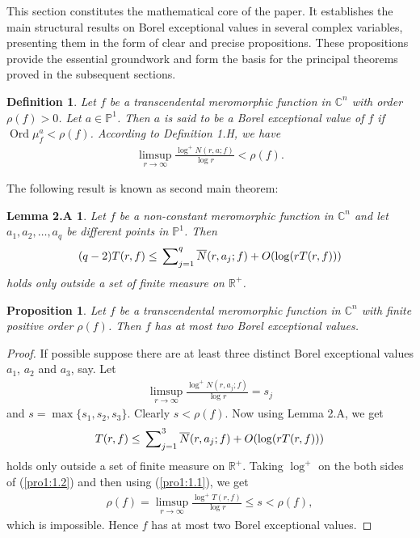 \documentclass[11pt,reqno]{amsart}
\newtheorem*{lem2A}{Lemma 2.A}
\newtheorem{defi}{Definition}[section]
\newtheorem{propo}{Proposition}[section]
\newcommand{\ol}{\overline}
\numberwithin{equation}{section}
\begin{document}
This section constitutes the mathematical core of the paper. It establishes the main structural results on Borel exceptional values in several complex variables, presenting them in the form of clear and precise propositions. These propositions provide the essential groundwork and form the basis for the principal theorems proved in the subsequent sections. 
 
\begin{defi} Let $f$ be a transcendental meromorphic function in $\mathbb{C}^n$ with order $\rho(f)>0$. Let $a\in\mathbb{P}^1$. Then $a$ is said to be a Borel exceptional value of $f$ if $\operatorname{Ord}\mu^a_f<\rho(f)$. According to Definition 1.H, we have
\begin{align*}
\limsup\limits_{r\to \infty} \frac{\log ^+ N(r,a;f)}{\log r}<\rho(f).
\end{align*}
\end{defi}

The following result is known as second main theorem:
\begin{lem2A}\label{L.2}\cite[Lemma 1.2]{Hu-Yang-1996} Let $f$ be a non-constant meromorphic function in $\mathbb{C}^n$ and let $a_1,a_2,\ldots,a_q$ be different points in $\mathbb{P}^1$. Then
\begin{align*}
(q-2)T(r,f)\leq \sideset{}{_{j=1}^{q}}{\sum} \ol N(r,a_j;f)+O(\log (rT(r,f)))
\end{align*}
holds only outside a set of finite measure on $\mathbb{R}^+$.
\end{lem2A}

\begin{propo}\label{pro0} Let $f$ be a transcendental meromorphic function in $\mathbb{C}^n$ with finite positive order $\rho(f)$. Then $f$ has at most two Borel exceptional values.
\end{propo}
\begin{proof} If possible suppose there are at least three distinct Borel exceptional values $a_1$, $a_2$ and $a_3$, say. Let 
\begin{align}\label{pro1:1.1}
 \limsup\limits_{r\to \infty} \frac{\log ^+ N(r,a_j;f)}{\log r}=s_j
 \end{align}
and $s=\max\{s_1,s_2,s_3\}$. Clearly $s<\rho(f)$. Now using Lemma 2.A, we get
\begin{align}\label{pro1:1.2}
T(r,f)\leq \sideset{}{_{j=1}^{3}}{\sum} \ol N(r,a_j;f)+O(\log (rT(r,f)))
\end{align}
holds only outside a set of finite measure on $\mathbb{R}^+$. Taking $\log^+$ on the both sides of (\ref{pro1:1.2}) and then using (\ref{pro1:1.1}), we get
\begin{align*}
\rho(f)=\limsup\limits_{r\to \infty} \frac{\log ^+ T(r,f)}{\log r}\leq s<\rho(f),
\end{align*}
which is impossible. Hence $f$ has at most two Borel exceptional values.
\end{proof}
\end{document}

